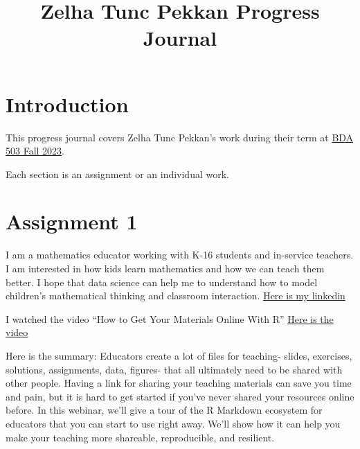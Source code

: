 \documentclass[
  letterpaper,
  DIV=11,
  numbers=noendperiod]{scrreprt}
\title{Zelha Tunc Pekkan Progress Journal}
\author{}
\date{}
\renewcommand*\contentsname{Table of contents}
\newcommand\contentsname{Table of contents}
\begin{document}
\maketitle
\ifdefined\Shaded\renewenvironment{Shaded}{\begin{tcolorbox}[frame hidden, boxrule=0pt, sharp corners, interior hidden, borderline west={3pt}{0pt}{shadecolor}, enhanced, breakable]}{\end{tcolorbox}}\fi

\renewcommand*\contentsname{Table of contents}
{
\hypersetup{linkcolor=}
\setcounter{tocdepth}{2}
\tableofcontents
}

\hypertarget{introduction}{%
\chapter*{Introduction}\label{introduction}}


This progress journal covers Zelha Tunc Pekkan's work during their term
at \href{https://mef-bda503.github.io/fall23/}{BDA 503 Fall 2023}.

Each section is an assignment or an individual work.


\hypertarget{assignment-1}{%
\chapter{Assignment 1}\label{assignment-1}}

I am a mathematics educator working with K-16 students and in-service
teachers. I am interested in how kids learn mathematics and how we can
teach them better. I hope that data science can help me to understand
how to model children's mathematical thinking and classroom interaction.
\href{https://www.linkedin.com/in/tuncpekkan/}{Here is my linkedin}

I watched the video ``How to Get Your Materials Online With R''
\href{\%22https://youtu.be/QcE4RBH2auQ?si=FfVFJoo9L9S9stqA}{Here is the
video}

Here is the summary: Educators create a lot of files for teaching-
slides, exercises, solutions, assignments, data, figures- that all
ultimately need to be shared with other people. Having a link for
sharing your teaching materials can save you time and pain, but it is
hard to get started if you've never shared your resources online before.
In this webinar, we'll give a tour of the R Markdown ecosystem for
educators that you can start to use right away. We'll show how it can
help you make your teaching more shareable, reproducible, and resilient.
\end{document}
